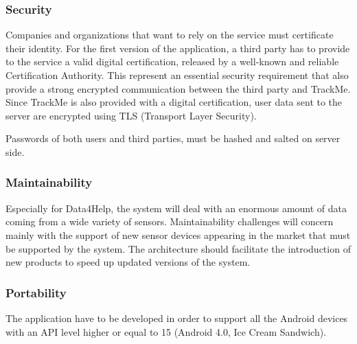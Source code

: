 \paragraph{}

{\color{Blue}\subsubsection{Security}}
Companies and organizations that want to rely on the service must certificate their identity. For the first version of the application, a third party has to provide to the service a valid digital certification, released by a well-known and reliable Certification Authority. This represent an essential security requirement that also provide a strong encrypted communication between the third party and TrackMe. Since TrackMe is also provided with a digital certification, user data sent to the server are encrypted using TLS (Transport Layer Security). \par
Passwords of both users and third parties, must be hashed and salted on server side.
\paragraph{}

{\color{Blue}\subsubsection{Maintainability}}

Especially for Data4Help, the system will deal with an enormous amount of data coming from a wide variety of sensors. Maintainability challenges will concern mainly with the support of new sensor devices appearing in the market that must be supported by the system. The architecture should facilitate the introduction of new products to speed up updated versions of the system.
\paragraph{}

{\color{Blue}\subsubsection{Portability}}

The application have to be developed in order to support all the Android devices with an API level higher or equal to 15 (Android 4.0, Ice Cream Sandwich).




